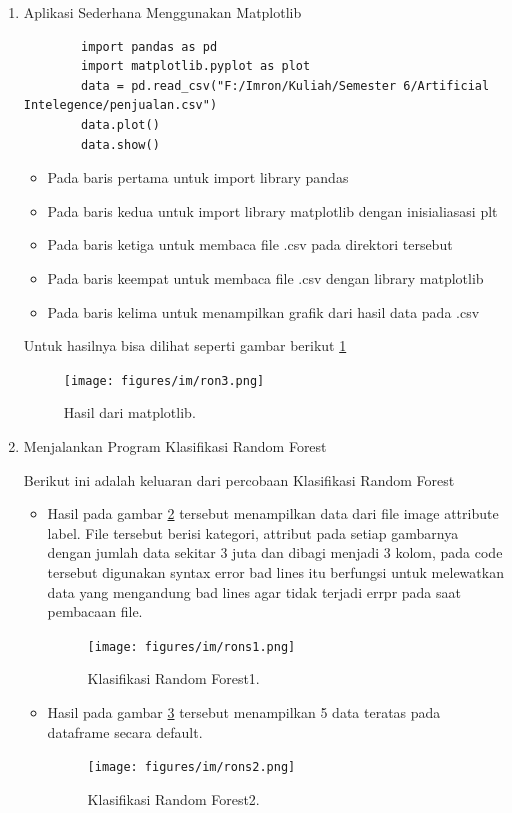 \begin{enumerate}
\item Aplikasi Sederhana Menggunakan Matplotlib \par
	\begin{verbatim}
		import pandas as pd
		import matplotlib.pyplot as plot
		data = pd.read_csv("F:/Imron/Kuliah/Semester 6/Artificial Intelegence/penjualan.csv")
		data.plot()
		data.show()
	\end{verbatim}
\begin{itemize}
\item Pada baris pertama untuk import library pandas
\item Pada baris kedua untuk import library matplotlib dengan inisialiasasi plt
\item Pada baris ketiga untuk membaca file .csv pada direktori tersebut
\item Pada baris keempat untuk membaca file .csv dengan library matplotlib
\item Pada baris kelima untuk menampilkan grafik dari hasil data pada .csv
\end{itemize}
Untuk hasilnya bisa dilihat seperti gambar berikut \ref{ron3}
		\begin{figure}[ht]
		\centerline{\texttt{[image: figures/im/ron3.png]}}
		\caption{Hasil dari matplotlib.}
		\label{ron3}
		\end{figure}

\item Menjalankan Program Klasifikasi Random Forest \par
Berikut ini adalah keluaran dari percobaan Klasifikasi Random Forest
\begin{itemize}
\item Hasil pada gambar \ref{rons1} tersebut menampilkan data dari file image attribute label. File tersebut berisi kategori, attribut pada setiap gambarnya dengan jumlah data sekitar 3 juta dan dibagi menjadi 3 kolom, pada code tersebut digunakan syntax error bad lines itu berfungsi untuk melewatkan data yang mengandung bad lines agar tidak terjadi errpr pada saat pembacaan file.
		\begin{figure}[ht]
		\centerline{\texttt{[image: figures/im/rons1.png]}}
		\caption{Klasifikasi Random Forest1.}
		\label{rons1}
		\end{figure}

\item Hasil pada gambar \ref{rons2} tersebut menampilkan 5 data teratas pada dataframe secara default.
		\begin{figure}[ht]
		\centerline{\texttt{[image: figures/im/rons2.png]}}
		\caption{Klasifikasi Random Forest2.}
		\label{rons2}
		\end{figure}


\end{itemize}
\end{enumerate}
